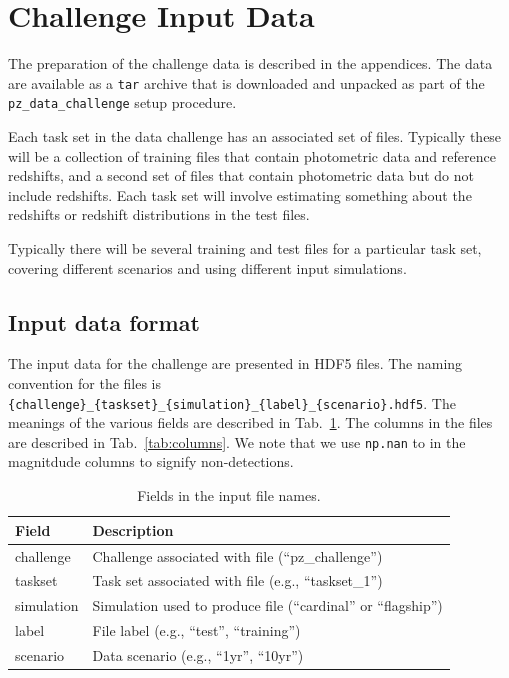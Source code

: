 \section{Challenge Input Data}
\label{sec:challenge_input_data}

The preparation of the challenge data is described in the appendices.
The data are available as a \texttt{tar} archive that is downloaded and
unpacked as part of the \texttt{pz\_data\_challenge} setup procedure.

Each task set in the data challenge has an associated set of files.
Typically these will be a collection of training files that contain
photometric data and reference redshifts, and a second set of files
that contain photometric data but do not include redshifts. Each
task set will involve estimating something about the redshifts or
redshift distributions in the test files.

Typically there will be several training and test files for a
particular task set, covering different scenarios and using different
input simulations.


\subsection{Input data format}

The input data for the challenge are presented in HDF5 files.
The naming convention for the files is
\texttt{\{challenge\}\_\{taskset\}\_\{simulation\}\_\{label\}\_\{scenario\}.hdf5}.
The meanings of the various \allowbreak fields are described in
Tab.~\ref{tab:file_fields}. The columns in the files are described
in Tab.~\ref{tab:columns}.  We note that we use \texttt{np.nan} to in
the magnitdude columns to signify non-detections.

\begin{table}[ht]
\centering
\caption{\label{tab:file_fields}\small Fields in the input file names.}
\begin{tabular}{ll}
  \hline\hline  
  Field & Description \\ \hline
  challenge & Challenge associated with file (``pz\_challenge'') \\
  taskset & Task set associated with file (e.g., ``taskset\_1'') \\
  simulation & Simulation used to produce file (``cardinal'' or ``flagship'') \\
  label & File label (e.g., ``test'', ``training'') \\
  scenario & Data scenario (e.g., ``1yr'', ``10yr'') \\
\hline\hline
\end{tabular}
\end{table}



